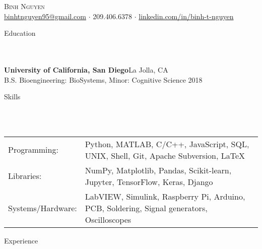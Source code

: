 \documentclass{article}
\newcommand{\lineunder} {
    \vspace*{-8pt} \\
    \hspace*{-18pt} \hrulefill \\
}
\newcommand{\header} [1] {
    {\hspace*{-18pt}\vspace*{6pt} \Large{#1} }
    \vspace*{-6pt} 
    \lineunder
}
\begin{document}

\vspace*{-40pt}


\begin{center}
	{\Huge \scshape {Binh Nguyen}}\\
	\vspace{2mm}
	\href{mailto:binhtnguyen95@gmail.com}{binhtnguyen95@gmail.com} $\cdot$ 
	209.406.6378 $\cdot$ 
	\href{https://www.linkedin.com/in/binh-t-nguyen}{linkedin.com/in/binh-t-nguyen} 
\end{center}

\header{Education}
\textbf{University of California, San Diego}\hfill La Jolla, CA\\
B.S. Bioengineering: BioSystems, Minor: Cognitive Science \hfill 2018\\
\vspace{7mm}

\header{Skills}
\vspace{1mm}
\begin{tabular}{ l l }
	Programming: & Python, MATLAB, C/C++, JavaScript, SQL, UNIX, Shell, Git, Apache Subversion, \LaTeX \\
	Libraries:   & NumPy, Matplotlib, Pandas, Scikit-learn, Jupyter, TensorFlow, Keras, Django \\
	Systems/Hardware:    & LabVIEW, Simulink, Raspberry Pi, Arduino, PCB, Soldering, Signal generators, Oscilloscopes  \\
\end{tabular}
\vspace{5mm}

\header{Experience}
\end{document}
